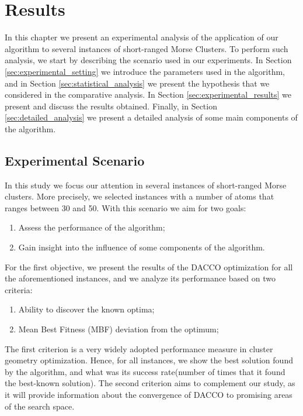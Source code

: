 \chapter{Results}

In this chapter we present an experimental analysis of the application of our algorithm to several instances of short-ranged Morse Clusters. To perform such analysis, we start by describing the scenario used in our experiments. In Section \ref{sec:experimental_setting} we introduce the parameters used in the algorithm, and in Section \ref{sec:statistical_analysis} we present the hypothesis that we considered in the comparative analysis. In Section \ref{sec:experimental_results} we present and discuss the results obtained. Finally, in Section \ref{sec:detailed_analysis} we present a detailed analysis of some main components of the algorithm.




\section{Experimental Scenario}
\label{sec:experimental_scenario}
In this study we focus our attention in several instances of short-ranged Morse clusters. More precisely, we selected instances with a number of atoms that ranges between 30 and 50. With this scenario we aim for two goals: 
	\begin{enumerate}
		\item Assess the performance of the algorithm;
		\item Gain insight into the influence of some components of the algorithm. 
	\end{enumerate}
	
	For the first objective, we present the results of the DACCO optimization for all the aforementioned instances, and we analyze its performance based on two criteria:
	\begin{enumerate}
		\item Ability to discover the known optima;
		\item Mean Best Fitness (MBF) deviation from the optimum;
	\end{enumerate}
	
	The first criterion is a very widely adopted performance measure in cluster geometry optimization. Hence, for all instances, we show the best solution found by the algorithm, and what was its success rate(number of times that it found the best-known solution).
	The second criterion aims to complement our study, as it will provide information about the convergence of DACCO to promising areas of the search space.
	

